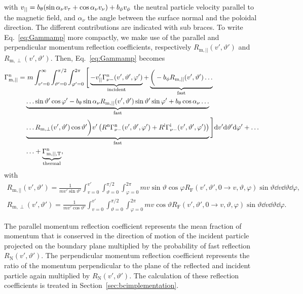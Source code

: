 \noindent with $v_{||} = b_{\theta} (\sin \alpha_{\nu} v_{\tau} + \cos \alpha_{\nu} v_{\nu}) + b_{\phi} v_{\phi}$ the neutral particle velocity parallel to the magnetic field, and $\alpha_{\nu}$ the angle between the surface normal and the poloidal direction. The different contributions are indicated with sub braces. To write Eq.~\eqref{eq:Gammamp} more compactly, we make use of the parallel and perpendicular momentum reflection coefficients, respectively $R_{\mathrm{m},||}(v',\vartheta')$ and $R_{\mathrm{m},\perp}(v',\vartheta')$. Then, Eq.~\eqref{eq:Gammamp} becomes
\begin{align}
\Gamma_{\mathrm{m},||}^{\mathrm{n}} =& \ m \int_{v'=0}^{\infty} \int_{\vartheta'=0}^{\pi/2} \int_{\varphi'=0}^{2\pi} \Bigg[ \underbrace{- v'_{||} \Gamma_{\nu-}^{\mathrm{n}}(v',\vartheta',\varphi')}_{\text{incident}} +  \underbrace{\bigg (- b_{\phi} R_{\mathrm{m},||}(v',\vartheta') \ldots}_{\text{fast}}  \nonumber \\
& \underbrace{\ldots  \sin \vartheta' \cos \varphi' - b_{\theta} \sin \alpha_{\nu} R_{\mathrm{m},||}(v',\vartheta') \sin \vartheta' \sin \varphi' + b_{\theta} \cos \alpha_{\nu}  \ldots}_{\text{fast}} \nonumber \\
&\underbrace{\ldots R_{\mathrm{m},\perp}(v',\vartheta') \cos \vartheta' \bigg ) v' \left( R^{\mathrm{n}} \Gamma_{\nu-}^{\mathrm{n}}(v',\vartheta',\varphi') + R^{\mathrm{i}} \Gamma_{\nu-}^{\mathrm{i}}(v',\vartheta',\varphi') \right)}_{\text{fast}} \Bigg] \mathrm{d} v' \mathrm{d} \vartheta' \mathrm{d} \varphi' + \ldots \nonumber \\
&\ldots + \underbrace{\Gamma_{\mathrm{m},||,\mathrm{T}}^{\mathrm{n}}}_{\text{thermal}}, \label{eq:Gammanmomp}
\end{align}
with
\begin{align}
R_{\mathrm{m},||}(v',\vartheta') = \frac{1}{mv'\sin\vartheta'} \int_{v=0}^{v'} \int_{\vartheta=0}^{\pi/2}\int_{\varphi=0}^{2\pi} m v \sin\vartheta \cos \varphi R_{\mathrm{F}}(v',\vartheta',0 \rightarrow v,\vartheta,\varphi) \sin \vartheta \dd v \dd \vartheta \dd \varphi, \label{eq:Rmpar}
\end{align}
\begin{align}
R_{\mathrm{m},\perp}(v',\vartheta') = \frac{1}{mv'\cos \vartheta'} \int_{v=0}^{v'} \int_{\vartheta=0}^{\pi/2} \int_{\varphi=0}^{2\pi} m v \cos \vartheta R_{\mathrm{F}}(v',\vartheta',0 \rightarrow v,\vartheta,\varphi) \sin \vartheta \dd v \dd \vartheta \dd \varphi. \label{eq:Rmperp}
\end{align}

The parallel momentum reflection coefficient represents the mean fraction of momentum that is conserved in the direction of motion of the incident particle projected on the boundary plane multiplied by the probability of fast reflection $R_{\mathrm{N}}(v',\vartheta')$. The perpendicular momentum reflection coefficient represents the ratio of the momentum perpendicular to the plane of the reflected and incident particle again multiplied by $R_{\mathrm{N}}(v',\vartheta')$. The calculation of these reflection coefficients is treated in Section~\ref{sec:bcimplementation}.

